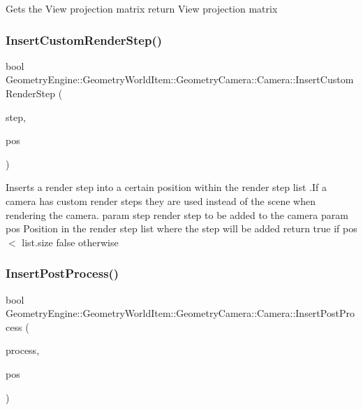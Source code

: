 Gets the View projection matrix return View projection matrix \mbox{\label{class_geometry_engine_1_1_geometry_world_item_1_1_geometry_camera_1_1_camera_aff83b52805cc8085af8f0802ab554c11}} 
\subsubsection{\texorpdfstring{InsertCustomRenderStep()}{InsertCustomRenderStep()}}
{\footnotesize\ttfamily bool Geometry\+Engine\+::\+Geometry\+World\+Item\+::\+Geometry\+Camera\+::\+Camera\+::\+Insert\+Custom\+Render\+Step (\begin{DoxyParamCaption}\item[{const \mbox{\hyperlink{class_geometry_engine_1_1_geometry_render_step_1_1_render_step}{Geometry\+Render\+Step\+::\+Render\+Step}} \&}]{step,  }\item[{unsigned int}]{pos }\end{DoxyParamCaption})\hspace{0.3cm}{\ttfamily [virtual]}}

Inserts a render step into a certain position within the render step list .If a camera has custom render steps they are used instead of the scene when rendering the camera. param step render step to be added to the camera param pos Position in the render step list where the step will be added return true if pos $<$ list.\+size false otherwise \mbox{\label{class_geometry_engine_1_1_geometry_world_item_1_1_geometry_camera_1_1_camera_a6079f2bacb9134ca0c3d7e8a97993f8c}} 
\subsubsection{\texorpdfstring{InsertPostProcess()}{InsertPostProcess()}}
{\footnotesize\ttfamily bool Geometry\+Engine\+::\+Geometry\+World\+Item\+::\+Geometry\+Camera\+::\+Camera\+::\+Insert\+Post\+Process (\begin{DoxyParamCaption}\item[{const \mbox{\hyperlink{class_geometry_engine_1_1_geometry_post_process_1_1_post_process}{Geometry\+Post\+Process\+::\+Post\+Process}} \&}]{process,  }\item[{unsigned int}]{pos }\end{DoxyParamCaption})\hspace{0.3cm}{\ttfamily [virtual]}}

